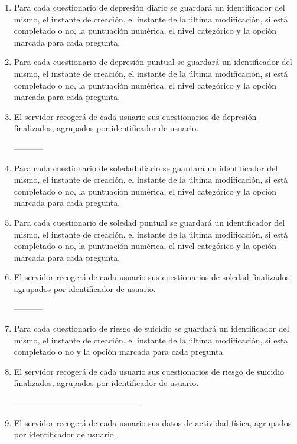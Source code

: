 \begin{enumerate}[label=\textbf{\texttt{RF-\arabic*}}]
            -----------
            \item Para cada cuestionario de depresión diario se guardará un identificador del mismo, el instante de creación, el instante de la última modificación, si está completado o no, la puntuación numérica, el nivel categórico y la opción marcada para cada pregunta.
            \item Para cada cuestionario de depresión puntual se guardará un identificador del mismo, el instante de creación, el instante de la última modificación, si está completado o no, la puntuación numérica, el nivel categórico y la opción marcada para cada pregunta.
            \item El servidor recogerá de cada usuario sus cuestionarios de depresión finalizados, agrupados por identificador de usuario.

            -----------
            \item Para cada cuestionario de soledad diario se guardará un identificador del mismo, el instante de creación, el instante de la última modificación, si está completado o no, la puntuación numérica, el nivel categórico y la opción marcada para cada pregunta.
            \item Para cada cuestionario de soledad puntual se guardará un identificador del mismo, el instante de creación, el instante de la última modificación, si está completado o no, la puntuación numérica, el nivel categórico y la opción marcada para cada pregunta.
            \item El servidor recogerá de cada usuario sus cuestionarios de soledad finalizados, agrupados por identificador de usuario.

            -----------
            \item Para cada cuestionario de riesgo de suicidio se guardará un identificador del mismo, el instante de creación, el instante de la última modificación, si está completado o no y la opción marcada para cada pregunta.
            
            \item El servidor recogerá de cada usuario sus cuestionarios de riesgo de suicidio finalizados, agrupados por identificador de usuario.
            
            ----------------------------------------------
            
            \item El servidor recogerá de cada usuario sus datos de actividad física, agrupados por identificador de usuario.
        

\end{enumerate}
